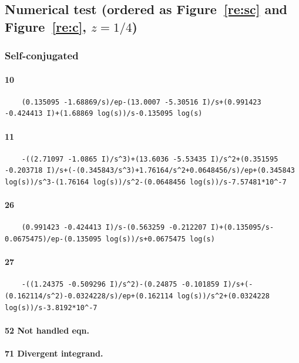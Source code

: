 \documentclass{article}
\newcommand{\WN}[1]{\textcolor{RawSienna}{#1}}
\newcommand{\WNNH}{\WN{Not handled eqn. }}
\newcommand{\WNDIV}{\WN{Divergent integrand. }}
\begin{document}
\subsection{Numerical test (ordered as Figure~\ref{re:sc} and Figure~\ref{re:c}, $z=1/4$)}
\subsubsection{Self-conjugated}
\paragraph{10}
\begin{verbatim}
	(0.135095 -1.68869/s)/ep-(13.0007 -5.30516 I)/s+(0.991423 -0.424413 I)+(1.68869 log(s))/s-0.135095 log(s)
\end{verbatim}
\paragraph{11}
\begin{verbatim}
	-((2.71097 -1.0865 I)/s^3)+(13.6036 -5.53435 I)/s^2+(0.351595 -0.203718 I)/s+(-(0.345843/s^3)+1.76164/s^2+0.0648456/s)/ep+(0.345843 log(s))/s^3-(1.76164 log(s))/s^2-(0.0648456 log(s))/s-7.57481*10^-7
\end{verbatim}
\paragraph{26}
\begin{verbatim}
	(0.991423 -0.424413 I)/s-(0.563259 -0.212207 I)+(0.135095/s-0.0675475)/ep-(0.135095 log(s))/s+0.0675475 log(s)
\end{verbatim}
\paragraph{27}
\begin{verbatim}
	-((1.24375 -0.509296 I)/s^2)-(0.24875 -0.101859 I)/s+(-(0.162114/s^2)-0.0324228/s)/ep+(0.162114 log(s))/s^2+(0.0324228 log(s))/s-3.8192*10^-7
\end{verbatim}
\paragraph{52	\WNNH}
\paragraph{71	\WNDIV}
\end{document}
